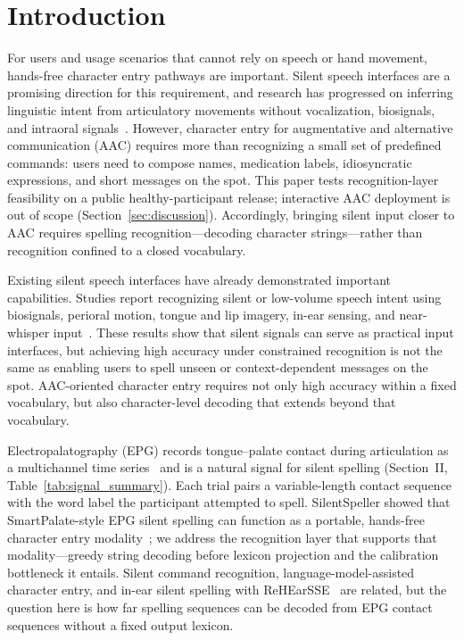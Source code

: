 \section{Introduction}

For users and usage scenarios that cannot rely on speech or hand movement, hands-free character entry pathways are important.
Silent speech interfaces are a promising direction for this requirement, and research has progressed on inferring linguistic intent from articulatory movements without vocalization, biosignals, and intraoral signals~\cite{denby2010silent,freitas2017an,gonzalez2020silent}.
However, character entry for augmentative and alternative communication (AAC) requires more than recognizing a small set of predefined commands: users need to compose names, medication labels, idiosyncratic expressions, and short messages on the spot.
This paper tests recognition-layer feasibility on a public healthy-participant release; interactive AAC deployment is out of scope (Section~\ref{sec:discussion}).
Accordingly, bringing silent input closer to AAC requires spelling recognition---decoding character strings---rather than recognition confined to a closed vocabulary.

Existing silent speech interfaces have already demonstrated important capabilities.
Studies report recognizing silent or low-volume speech intent using biosignals, perioral motion, tongue and lip imagery, in-ear sensing, and near-whisper input~\cite{hueber2010development,dong2024rehearsse}.
These results show that silent signals can serve as practical input interfaces, but achieving high accuracy under constrained recognition is not the same as enabling users to spell unseen or context-dependent messages on the spot.
AAC-oriented character entry requires not only high accuracy within a fixed vocabulary, but also character-level decoding that extends beyond that vocabulary.

Electropalatography (EPG) records tongue--palate contact during articulation as a multichannel time series~\cite{hardcastle1989new,hardcastle1990electropalatography,verhoeven2019visualisation} and is a natural signal for silent spelling (Section~II, Table~\ref{tab:signal_summary}).
Each trial pairs a variable-length contact sequence with the word label the participant attempted to spell.
SilentSpeller showed that SmartPalate-style EPG silent spelling can function as a portable, hands-free character entry modality~\cite{kimura2022silentspeller}; we address the recognition layer that supports that modality---greedy string decoding before lexicon projection and the calibration bottleneck it entails.
Silent command recognition, language-model-assisted character entry, and in-ear silent spelling with ReHEarSSE~\cite{dong2024rehearsse} are related, but the question here is how far spelling sequences can be decoded from EPG contact sequences without a fixed output lexicon.


